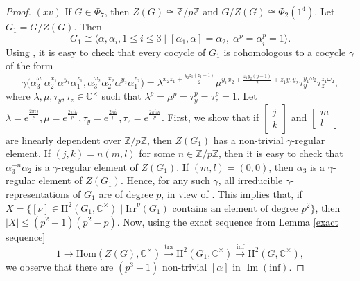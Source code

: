 \documentclass[a4paper,11pt]{amsart}
\numberwithin{equation}{section}
\numberwithin{equation}{subsection}
\newcommand{\C}{\mathbb{C}}
\newcommand{\Z}{\mathbb{Z}}
\newcommand{\irr}{\mathrm{Irr}}
\newcommand{\poonam}[1]{{\color{blue} #1}}
\begin{document}
\begin{proof}
$(xv)$ \label{Phi7}
If $G \in \Phi_{7}$, then $Z(G)\cong \Z/p\Z$ and $G/Z(G) \cong \Phi_2(1^4)$. Let $G_1= G/Z(G)$. Then 
\[
G_1 \cong \langle \alpha, \alpha_i, 1\leq i \leq 3 \mid [\alpha_1,\alpha] = \alpha_2,\; \alpha^{p}= \alpha_i^{p} =1 \rangle.
\]
Using \cite[Theorem 9.4]{Mackey}, it is easy to check that every cocycle of $G_1$ is cohomologous to a cocycle $\gamma$ of the form \[
\gamma\big(\alpha_3^{\omega_1} \alpha_2^{x_1} \alpha^{y_1} \alpha_1^{z_1},\alpha_3^{\omega_2} \alpha_2^{x_2} \alpha^{y_2} \alpha_1^{z_2}\big) = \lambda^{x_2 z_1+\frac{y_2 z_1\left(z_1-1\right)}{2}}\mu^{ y_1 x_2+\frac{z_1 y_2(y-1)}{2}+z_1 y_1 y_2}\tau_y^{y_1 \omega_2} \tau_z^{z_1 \omega_2},\] where $\lambda,\mu,\tau_y,\tau_z \in \C^\times$ such that $\lambda^p= \mu^p = \tau_y^p = \tau_z^p= 1.$ 
Let $\lambda= e^{\frac{2 \pi i j}{p}}, \mu= e^{\frac{2 \pi i k}{p}}, \tau_y= e^{\frac{2 \pi i l}{p}}, \tau_z= e^{\frac{2 \pi i m}{p}}$. First, we show that if $\left[\begin{array}{l}j \\ k\end{array}\right]$ and $\left[\begin{array}{l}m \\  l \end{array}\right]$ are linearly dependent over $\Z/p\Z$, then $Z(G_1)$ has a non-trivial $\gamma$-regular element. If $(j,k)=n(m,l)$ for some $n\in \Z/p\Z$, then it is easy to check that $\alpha_3^{-n} \alpha_2$ is a $\gamma$-regular element of $Z(G_1)$. If $(m,l)=(0,0)$, then $\alpha_3$ is a $\gamma$-regular element of $Z(G_1)$. Hence, for any such $\gamma$, all irreducible $\gamma$-representations of $G_1$ are of degree $p$, in view of \cite[Chapter 2, Lemma 5.1]{karpilovsky3}. This implies  
that, if $X= \{[\nu] \in \mathrm{H}^2(G_1,\C^\times) \mid  \irr^\nu(G_1) \text{ contains an element of degree } p^2\}$, then $|X| \leq (p^2-1)(p^2-p)$.
Now, using the exact sequence from Lemma \ref{exact sequence}
$$1 \to \mathrm{Hom}(Z(G), \mathbb{C}^{\times}) 
\xrightarrow{\mathrm{tra}} 
\mathrm{H}^2(G_1, \mathbb{C}^{\times}) 
\xrightarrow{\mathrm{inf}} \mathrm{H}^2(G, \mathbb{C}^{\times}),$$ 
we observe that there are $(p^3-1)$ non-trivial $[\alpha]$ in $\operatorname{Im}\operatorname{(inf)}$.

\end{proof}
\end{document}
